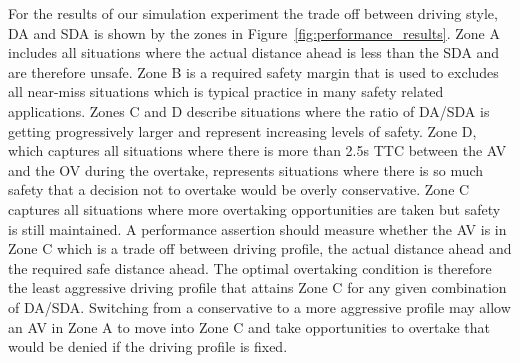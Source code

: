 For the results of our simulation experiment the trade off between driving style, DA and SDA is shown by the zones in Figure~\ref{fig:performance_results}. 
%
Zone A includes all situations where the actual distance ahead is less than the SDA and are therefore unsafe. Zone B is a required safety margin that is used to  excludes all near-miss situations which is typical practice in many safety related applications. 
%
Zones C and D describe situations where the ratio of DA/SDA is  getting progressively larger and represent increasing levels of safety. 
%
Zone D, which captures all situations where there is more than 2.5s TTC between the AV and the OV during the overtake, represents situations where there is so much safety that a decision not to overtake would be overly conservative. Zone C captures all situations where more overtaking opportunities are taken but safety is still maintained. 
%
A performance assertion should measure whether the AV is in Zone C which is a trade off between driving profile, the actual distance ahead and the required safe distance ahead. The optimal overtaking condition is therefore the least aggressive driving profile that attains Zone C for any given combination of DA/SDA. 
%
Switching from a conservative to a more aggressive profile may allow an AV in Zone A to move into Zone C and take opportunities to overtake that would be denied if the driving profile is fixed. 



%
%

